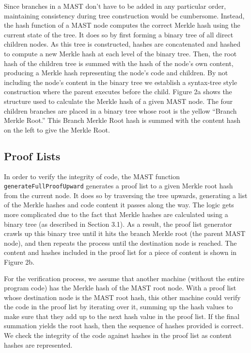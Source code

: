 \documentclass{vldb}
\begin{document}
Since branches in a MAST don't have to be added in any particular order,
maintaining consistency during tree construction would be cumbersome. Instead,
the hash function of a MAST node computes the correct Merkle hash using the
current state of the tree. It does so by first forming a binary tree of all
direct children nodes. As this tree is constructed, hashes are concatenated and
hashed to compute a new Merkle hash at each level of the binary tree. Then, the
root hash of the children tree is summed with the hash of the node's own
content, producing a Merkle hash representing the node's code and children. By
not including the node's content in the binary tree we establish a syntax-tree
style construction where the parent executes before the child. Figure 2a shows
the structure used to calculate the Merkle hash of a given MAST node. The four
children branches are placed in a binary tree whose root is the yellow ``Branch
Merkle Root.'' This Branch Merkle Root hash is summed with the content hash on
the left to give the Merkle Root.


\subsection{Proof Lists}

In order to verify the integrity of code, the MAST function
\texttt{generateFullProofUpward}  generates a proof list to a given Merkle root
hash from the current node. It does so by traversing the tree upwards,
generating a list of the Merkle hashes and code content it passes along the
way. The logic gets more complicated due to the fact that Merkle hashes are
calculated using a binary tree (as described in Section 3.1). As a result, the
proof list generator crawls up this binary tree until it hits the branch Merkle
root (the parent MAST node), and then repeats the process until the destination
node is reached. The content and hashes included in the proof list for a piece
of content is shown in Figure 2b.

For the verification process, we assume that another machine (without the
entire program code) has the Merkle hash of the MAST root node. With a proof
list whose destination node is the MAST root hash, this other machine could
verify the code in the proof list by iterating over it, summing up the hash
values to make sure that they add up to the next hash value in the proof list.
If the final summation yields the root hash, then the sequence of hashes
provided is correct. We check the integrity of the code against hashes in the
proof list as content hashes are represented.
\end{document}

